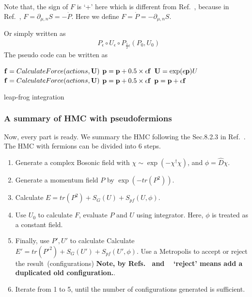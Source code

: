 Note that, the sign of $F$ is `+' here which is different from Ref.~\cite{latticeqcdbook2010}, because in Ref.~\cite{latticeqcdbook2010}, $F=\partial _{\mu,n}S = -\dot{P}$. Here we define $F=\dot{P}=-\partial _{\mu,n}S$.

Or simply written as
\begin{equation}
\begin{split}
&P_{\epsilon}\circ U_{\epsilon}\circ P_{\frac{1}{2}\epsilon}\left(P_0,U_0\right)
\end{split}
\label{eq.hmc.update_leapfrog2}
\end{equation}
The pseudo code can be written as

\begin{algorithm}[H]
\begin{algorithmic}
\State ${\bf f}=CalculateForce(actions,{\bf U})$
\State ${\bf p}={\bf p}+0.5 \times \epsilon {\bf f}$
    \State ${\bf U}=\exp (\epsilon {\bf p})U$
    \State ${\bf f}=CalculateForce(actions,{\bf U})$
        \State ${\bf p}={\bf p}+0.5 \times \epsilon {\bf f}$
    \Else
        \State ${\bf p}={\bf p}+\epsilon {\bf f}$
    \EndIf
\EndFor
\end{algorithmic}
\caption{leap-frog integration}
\end{algorithm}

\subsubsection{\label{sec:summaryOfHMC}A summary of HMC with pseudofermions}

Now, every part is ready. We summary the HMC following the Sec.8.2.3 in Ref.~\cite{latticeqcdbook2010}. The HMC with fermions can be divided into 6 steps.

\begin{enumerate}
  \item Generate a complex Bosonic field with $\chi \sim \exp (-\chi ^{\dagger}\chi)$, and $\phi = \hat{D} \chi$.
  \item Generate a momentum field $P$ by $\exp (-tr(P^2))$.
  \item Calculate $E=tr(P^2)+S_G(U)+S_{pf}(U,\phi)$.
  \item Use $U_0$ to calculate $F$, evaluate $P$ and $U$ using integrator. Here, $\phi$ is treated as a constant field.
  \item Finally, use $P',U'$ to calculate Calculate $E'=tr({P'}^2)+S_G(U')+S_{pf}(U',\phi)$. Use a Metropolis to accept or reject the result~(configurations) \textbf{Note, by Refs.~\cite{latticeqcdbook2010} and ~\cite{latticeqcdreview2009} `reject' means add a duplicated old configuration.}.
  \item Iterate from 1 to 5, until the number of configurations generated is sufficient.
\end{enumerate}

